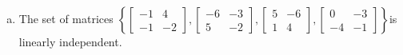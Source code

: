 \begin{exerciseAnswer}
\begin{enumerate}[(a)]
\item The set of matrices \( \left\{ \left[\begin{array}{cc}
-1 & 4 \\
-1 & -2
\end{array}\right] , \left[\begin{array}{cc}
-6 & -3 \\
5 & -2
\end{array}\right] , \left[\begin{array}{cc}
5 & -6 \\
1 & 4
\end{array}\right] , \left[\begin{array}{cc}
0 & -3 \\
-4 & -1
\end{array}\right] \right\} \)is linearly independent.
\end{enumerate}
    
\end{exerciseAnswer}
    
